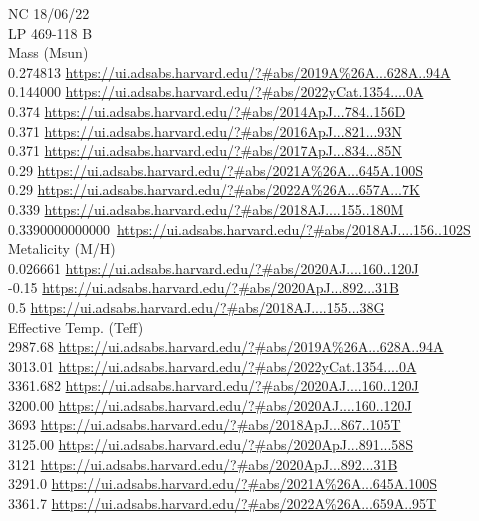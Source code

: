 NC 18/06/22\\
LP 469-118 B \\

Mass (Msun)\\
0.274813 \url{https://ui.adsabs.harvard.edu/?#abs/2019A%26A...628A..94A}\\
0.144000 \url{https://ui.adsabs.harvard.edu/?#abs/2022yCat.1354....0A}\\
0.374 \url{https://ui.adsabs.harvard.edu/?#abs/2014ApJ...784..156D}\\
0.371 \url{https://ui.adsabs.harvard.edu/?#abs/2016ApJ...821...93N}\\
0.371 \url{https://ui.adsabs.harvard.edu/?#abs/2017ApJ...834...85N}\\
0.29 \url{https://ui.adsabs.harvard.edu/?#abs/2021A%26A...645A.100S}\\
0.29 \url{https://ui.adsabs.harvard.edu/?#abs/2022A%26A...657A...7K}\\
0.339 \url{https://ui.adsabs.harvard.edu/?#abs/2018AJ....155..180M}\\
0.3390000000000\ \url{https://ui.adsabs.harvard.edu/?#abs/2018AJ....156..102S}\\
Metalicity (M/H)\\
0.026661 \url{https://ui.adsabs.harvard.edu/?#abs/2020AJ....160..120J}\\
-0.15 \url{https://ui.adsabs.harvard.edu/?#abs/2020ApJ...892...31B}\\
0.5 \url{https://ui.adsabs.harvard.edu/?#abs/2018AJ....155...38G}\\
Effective Temp. (Teff)\\
2987.68 \url{https://ui.adsabs.harvard.edu/?#abs/2019A%26A...628A..94A}\\
3013.01 \url{https://ui.adsabs.harvard.edu/?#abs/2022yCat.1354....0A}\\
3361.682 \url{https://ui.adsabs.harvard.edu/?#abs/2020AJ....160..120J}\\
3200.00 \url{https://ui.adsabs.harvard.edu/?#abs/2020AJ....160..120J}\\
3693 \url{https://ui.adsabs.harvard.edu/?#abs/2018ApJ...867..105T}\\
3125.00 \url{https://ui.adsabs.harvard.edu/?#abs/2020ApJ...891...58S}\\
3121 \url{https://ui.adsabs.harvard.edu/?#abs/2020ApJ...892...31B}\\
3291.0 \url{https://ui.adsabs.harvard.edu/?#abs/2021A%26A...645A.100S}\\
3361.7 \url{https://ui.adsabs.harvard.edu/?#abs/2022A%26A...659A..95T}\\

